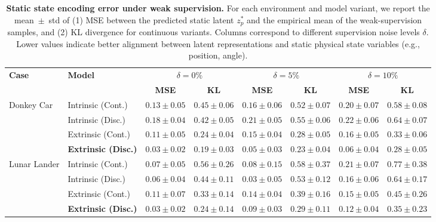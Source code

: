 \documentclass[nonacm,sigconf]{acmart}
\begin{document}
\begin{table}[ht!]
\centering
\caption{
\textbf{Static state encoding error under weak supervision.}
For each environment and model variant, we report the mean~$\pm$~std of 
(1) MSE between the predicted static latent $z^{*}_{p}$ and the empirical mean 
of the weak-supervision samples, and 
(2) KL divergence for continuous variants.  
Columns correspond to different supervision noise levels $\delta$.
Lower values indicate better alignment between latent representations and 
static physical state variables (e.g., position, angle).
}
\label{tab:static_rmse_all_noise}
\footnotesize %
\begin{tabular}{@{}llcccccc@{}}
\toprule
\multirow{2}{*}{\textbf{Case}} & \multirow{2}{*}{\textbf{Model}} & \multicolumn{2}{c}{\textbf{$\delta = 0\%$}} & \multicolumn{2}{c}{\textbf{$\delta = 5\%$}} & \multicolumn{2}{c}{\textbf{$\delta = 10\%$}} \\
\cmidrule(lr){3-4} \cmidrule(lr){5-6} \cmidrule(lr){7-8}
 &  & \textbf{MSE} & \textbf{KL} & \textbf{MSE} & \textbf{KL} & \textbf{MSE} & \textbf{KL} \\ \midrule
\multirow{4}{*}{Donkey Car} & Intrinsic (Cont.) & $0.13 \pm 0.05$ & $0.45 \pm 0.06$ & $0.16 \pm 0.06$ & $0.52 \pm 0.07$ & $0.20 \pm 0.07$ & $0.58 \pm 0.08$ \\
 & Intrinsic (Disc.) & $0.18 \pm 0.04$ & $0.42 \pm 0.05$ & $0.21 \pm 0.05$ & $0.55 \pm 0.06$ & $0.22 \pm 0.06$ & $0.64 \pm 0.07$ \\
 & Extrinsic (Cont.) & $0.11 \pm 0.05$ & $0.24 \pm 0.04$ & $0.15 \pm 0.04$ & $0.28 \pm 0.05$ & $0.16 \pm 0.05$ & $0.33 \pm 0.06$ \\
 & \textbf{Extrinsic (Disc.)} & {$0.03 \pm 0.02$} & $0.19 \pm 0.03$ & {$0.05 \pm 0.03$} & $0.23 \pm 0.04$ & {$0.06 \pm 0.04$} & $0.28 \pm 0.05$ \\ \midrule
\multirow{4}{*}{Lunar Lander} & Intrinsic (Cont.) & $0.07 \pm 0.05$ & $0.56 \pm 0.26$ & $0.08 \pm 0.15$ & {$0.58 \pm 0.37$} & $0.21 \pm 0.07$ & $0.77 \pm 0.38$ \\
 & Intrinsic (Disc.) & $0.06 \pm 0.04$ & $0.44 \pm 0.11$ & $0.03 \pm 0.05$ & $0.53 \pm 0.12$ & $0.16 \pm 0.06$ & $0.64 \pm 0.17$ \\
 & Extrinsic (Cont.) & $0.11 \pm 0.07$ & $0.33 \pm 0.14$ & $0.14 \pm 0.04$ & $0.39 \pm 0.16$ & $0.15 \pm 0.05$ & $0.45 \pm 0.26$ \\
 & \textbf{Extrinsic (Disc.)} & \textbf{$0.03 \pm 0.02$} & $0.24 \pm 0.14$ & \textbf{$0.09 \pm 0.03$} & $0.29 \pm 0.11$ & \textbf{$0.12 \pm 0.04$} & $0.35 \pm 0.23$ \\ \bottomrule
\end{tabular}
\end{table}
\end{document}
